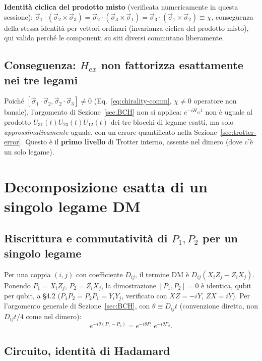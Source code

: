 \documentclass[11pt,a4paper]{article}
\begin{document}
\textbf{Identità ciclica del prodotto misto} (verificata numericamente in questa sessione): $\vec\sigma_1\cdot(\vec\sigma_2\times\vec\sigma_3) = \vec\sigma_2\cdot(\vec\sigma_3\times\vec\sigma_1) = \vec\sigma_3\cdot(\vec\sigma_1\times\vec\sigma_2) \equiv \chi$, conseguenza della stessa identità per vettori ordinari (invarianza ciclica del prodotto misto), qui valida perché le componenti su siti diversi commutano liberamente.

\subsection{Conseguenza: $H_{ex}$ non fattorizza esattamente nei tre legami}

Poiché $[\vec\sigma_1\!\cdot\!\vec\sigma_2,\vec\sigma_2\!\cdot\!\vec\sigma_3]\neq0$ (Eq.~\eqref{eq:chirality-comm}, $\chi\neq0$ operatore non banale), l'argomento di Sezione~\ref{sec:BCH} non si applica: $e^{-iH_{ex}t}$ non è uguale al prodotto $U_{31}(t)U_{23}(t)U_{12}(t)$ dei tre blocchi di legame esatti, ma solo \emph{approssimativamente} uguale, con un errore quantificato nella Sezione~\ref{sec:trotter-error}. Questo è il \textbf{primo livello} di Trotter interno, assente nel dimero (dove c'è un solo legame).

\section{Decomposizione esatta di un singolo legame DM}
\label{sec:U2-bond}

\subsection{Riscrittura e commutatività di $P_1,P_2$ per un singolo legame}

Per una coppia $(i,j)$ con coefficiente $D_{ij}$, il termine DM è $D_{ij}(X_iZ_j-Z_iX_j)$. Ponendo $P_1=X_iZ_j$, $P_2=Z_iX_j$, la dimostrazione $[P_1,P_2]=0$ è identica, qubit per qubit, a \texttt{} \S4.2 ($P_1P_2=P_2P_1=Y_iY_j$, verificato con $XZ=-iY$, $ZX=iY$). Per l'argomento generale di Sezione~\ref{sec:BCH}, con $\theta\equiv D_{ij}t$ (convenzione diretta, non $D_{ij}t/4$ come nel dimero):
\begin{equation}
e^{-i\theta(P_1-P_2)} = e^{-i\theta P_1}\,e^{+i\theta P_2}.
\end{equation}

\subsection{Circuito, identità di Hadamard}
\end{document}
